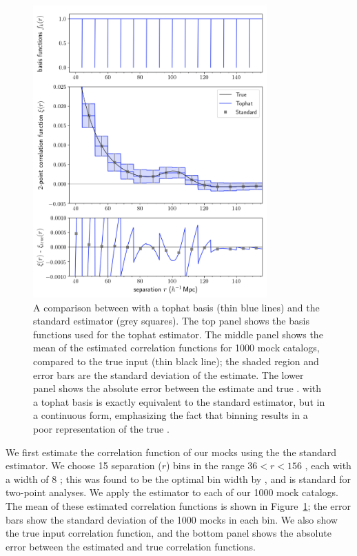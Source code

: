 \begin{figure}%
    \centering
    \includegraphics[width=0.8\textwidth]{xicomparison_2e-4_tophat8_theory8}
    \caption{A comparison between \est with a tophat basis (thin blue lines) and the standard estimator (grey squares). The top panel shows the basis functions used for the tophat estimator. The middle panel shows the mean of the estimated correlation functions for 1000 mock catalogs, compared to the true input \cf (thin black line); the shaded region and error bars are the standard deviation of the \cf estimate. The lower panel shows the absolute error between the estimate and true \cf. \Est with a tophat basis is exactly equivalent to the standard estimator, but in a continuous form, emphasizing the fact that binning results in a poor representation of the true \cf.}
    \label{fig:tophat}
\end{figure}
    
We first estimate the correlation function of our mocks using the the standard estimator.
We choose 15 separation ($r$) bins in the range $36 < r < 156$ \hmpc, each with a width of 8 \hmpc; this was found to be the optimal bin width by \cite{Percival2014}, and is standard for two-point analyses.
We apply the estimator to each of our 1000 mock catalogs.
The mean of these estimated correlation functions is shown in Figure~\ref{fig:tophat}; the error bars show the standard deviation of the 1000 mocks in each bin.
We also show the true input correlation function, and the bottom panel shows the absolute error between the estimated and true correlation functions.

